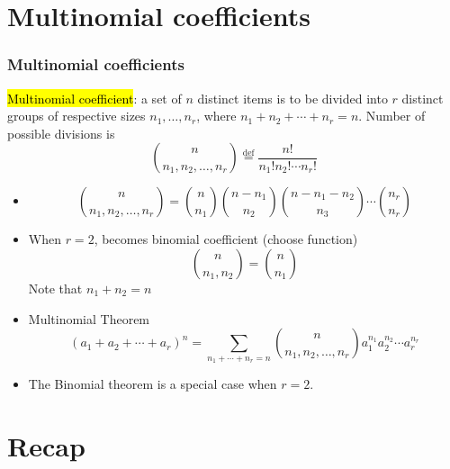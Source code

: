 \documentclass[slidestop,compress,mathserif]{beamer}
\begin{document}
\section{Multinomial coefficients}
\begin{frame}\frametitle{Multinomial coefficients}

\begin{dinglist}{\DingListSymbolA}
\item  \hl{Multinomial coefficient}: a set of $n$ distinct items is to be
divided into $r$ distinct groups of respective sizes $n_1, \ldots, n_r$, where $n_1 + n_2 + \cdots + n_r = n$.
Number of possible divisions is
\[
{n \choose n_1, n_2, \ldots, n_r} \stackrel{\text{def}}{=} \frac{n!}{n_1!n_2! \cdots n_r!}
\]
\end{dinglist}

\end{frame}

\begin{frame}%

\begin{itemize}
\item
\[
{n \choose n_1, n_2, \ldots, n_r} = {n \choose n_1}{n-n_1 \choose n_2}{n-n_1-n_2 \choose n_3}\cdots{n_r \choose n_r}
\]
\pause

\item When $r = 2$, becomes binomial coefficient (choose function)
\[
{n \choose n_1, n_2} = {n \choose n_1}
\]
Note that $n_1 + n_2 = n$

\pause
\item Multinomial Theorem
\[
(a_1 + a_2 + \cdots + a_r)^n = \sum_{n_1 + \cdots + n_r = n} {n \choose n_1, n_2, \ldots, n_r} a_1^{n_1} a_2^{n_2} \cdots a_r^{n_r}
\]

\pause
\item The Binomial theorem is a special case when $r = 2$.
\end{itemize}

\end{frame}



\section{Recap}
\end{document}
